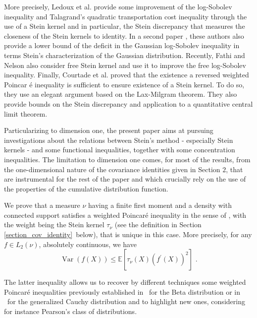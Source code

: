 \documentclass[11pt]{article}
\DeclareMathOperator{\var}{Var}
\begin{document}
More precisely, Ledoux et al. \cite{LedoucNourdinPeccati:15} provide some
improvement of the log-Sobolev inequality and Talagrand's quadratic
transportation cost inequality through the use of a Stein kernel and in
particular, the Stein discrepancy that measures the closeness of the Stein
kernels to identity. In a second paper \cite{MR3665794}, these authors also
provide a lower bound of the deficit in the Gaussian log-Sobolev inequality
in terms Stein's characterization of the Gaussian distribution. Recently,
Fathi and Nelson \cite{MR3682667} also consider free Stein kernel and use it
to improve the free log-Sobolev inequality. Finally, Courtade et al. \cite%
{courtade2017existence} proved that the existence a reversed weighted Poincar%
\'{e} inequality is sufficient to ensure existence of a Stein kernel. To do
so, they use an elegant argument based on the Lax-Milgram theorem. They also
provide bounds on the Stein discrepancy and application to a quantitative
central limit theorem.

Particularizing to dimension one, the present paper aims at pursuing
investigations about the relations between Stein's method - especially Stein
kernels - and some functional inequalities, together with some concentration
inequalities. The limitation to dimension one comes, for most of the
results, from the one-dimensional nature of the covariance identities given
in Section $2$, that are instrumental for the rest of the paper and which
crucially rely on the use of the properties of the cumulative distribution
function.

We prove that a measure $\nu $ having a finite first moment and a density
with connected support satisfies a weighted Poincar\'{e} inequality in the
sense of \cite{MR2510011}, with the weight being the Stein kernel $\tau
_{\nu }$ (see the definition in Section \ref{section_cov_identity}\ below),
that is unique in this case. More precisely, for any $f\in L_{2}\left( \nu
\right) $, absolutely continuous, we have%
\begin{equation}
\var%
\left( f\left( X\right) \right) \leq \mathbb{E}\left[ \tau _{\nu }\left(
X\right) \left( f^{\prime }\left( X\right) \right) ^{2}\right] \text{ .}
\label{intro_ineq_weight_Poin}
\end{equation}

The latter inequality allows us to recover by different techniques some
weighted Poincar\'{e} inequalities previously established in \cite%
{BobkovLedoux:14}\ for the Beta distribution or in \cite{MR3519678}\ for the
generalized Cauchy distribution and to highlight new ones, considering for
instance Pearson's class of distributions.
\end{document}

